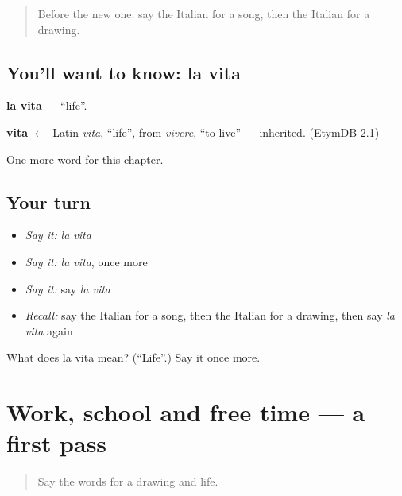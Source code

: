 \begin{quote}
Before the new one: say the Italian for a song, then the Italian for a drawing.
\end{quote}

\subsection*{You'll want to know: la vita}
\textbf{la vita} — \textquotedblleft{}life\textquotedblright{}.

\begin{cousinweb}
\textbf{vita} $\leftarrow$ Latin \emph{vita}, \textquotedblleft{}life\textquotedblright{}, from \emph{vivere}, \textquotedblleft{}to live\textquotedblright{} — inherited. (EtymDB 2.1)
\end{cousinweb}

\begin{grammarlens}[title={What you've built}]
One more word for this chapter.
\end{grammarlens}

\subsection*{Your turn}
\begin{itemize}
\raggedright
  \item \emph{Say it:} \emph{la vita}
  \item \emph{Say it:} \emph{la vita}, once more
  \item \emph{Say it:} say \emph{la vita}
  \item \emph{Recall:} say the Italian for a song, then the Italian for a drawing, then say \emph{la vita} again
\end{itemize}

\begin{tcolorbox}[breakable,colback=teal!4,colframe=teal!35!black,title={Before you move on}]
What does la vita mean? (\textquotedblleft{}Life\textquotedblright{}.) Say it once more.
\end{tcolorbox}
\section[(dialogue)]{Work, school and free time — a first pass}

\label{lesson:IT-R116-first-pass-work-school-and-free-time}



\begin{quote}
Say the words for a drawing and life.
\end{quote}

